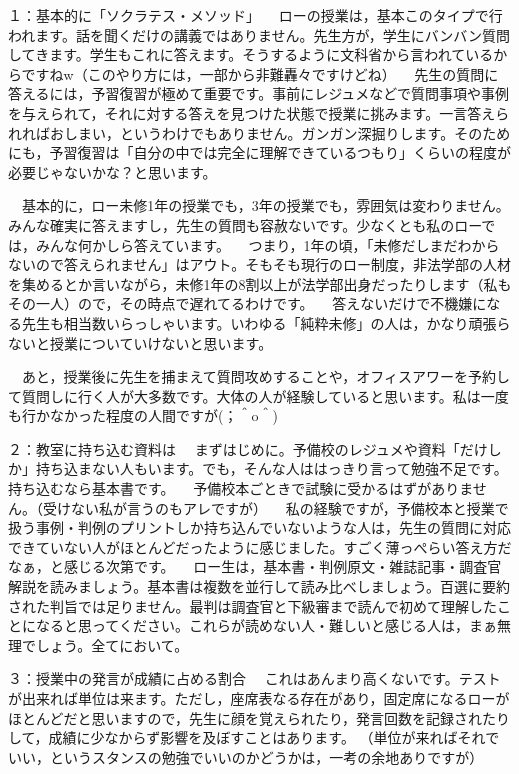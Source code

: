 １：基本的に「ソクラテス・メソッド」
　ローの授業は，基本このタイプで行われます。話を聞くだけの講義ではありません。先生方が，学生にバンバン質問してきます。学生もこれに答えます。そうするように文科省から言われているからですねw（このやり方には，一部から非難轟々ですけどね）
　先生の質問に答えるには，予習復習が極めて重要です。事前にレジュメなどで質問事項や事例を与えられて，それに対する答えを見つけた状態で授業に挑みます。一言答えられればおしまい，というわけでもありません。ガンガン深掘りします。そのためにも，予習復習は「自分の中では完全に理解できているつもり」くらいの程度が必要じゃないかな？と思います。

　基本的に，ロー未修1年の授業でも，3年の授業でも，雰囲気は変わりません。みんな確実に答えますし，先生の質問も容赦ないです。少なくとも私のローでは，みんな何かしら答えています。
　つまり，1年の頃，「未修だしまだわからないので答えられません」はアウト。そもそも現行のロー制度，非法学部の人材を集めるとか言いながら，未修1年の8割以上が法学部出身だったりします（私もその一人）ので，その時点で遅れてるわけです。
　答えないだけで不機嫌になる先生も相当数いらっしゃいます。いわゆる「純粋未修」の人は，かなり頑張らないと授業についていけないと思います。

　あと，授業後に先生を捕まえて質問攻めすることや，オフィスアワーを予約して質問しに行く人が大多数です。大体の人が経験していると思います。私は一度も行かなかった程度の人間ですが(；＾o＾)

２：教室に持ち込む資料は
　まずはじめに。予備校のレジュメや資料「だけしか」持ち込まない人もいます。でも，そんな人ははっきり言って勉強不足です。持ち込むなら基本書です。
　予備校本ごときで試験に受かるはずがありません。（受けない私が言うのもアレですが）
　私の経験ですが，予備校本と授業で扱う事例・判例のプリントしか持ち込んでいないような人は，先生の質問に対応できていない人がほとんどだったように感じました。すごく薄っぺらい答え方だなぁ，と感じる次第です。
　ロー生は，基本書・判例原文・雑誌記事・調査官解説を読みましょう。基本書は複数を並行して読み比べしましょう。百選に要約された判旨では足りません。最判は調査官と下級審まで読んで初めて理解したことになると思ってください。これらが読めない人・難しいと感じる人は，まぁ無理でしょう。全てにおいて。

３：授業中の発言が成績に占める割合
　これはあんまり高くないです。テストが出来れば単位は来ます。ただし，座席表なる存在があり，固定席になるローがほとんどだと思いますので，先生に顔を覚えられたり，発言回数を記録されたりして，成績に少なからず影響を及ぼすことはあります。
（単位が来ればそれでいい，というスタンスの勉強でいいのかどうかは，一考の余地ありですが）

